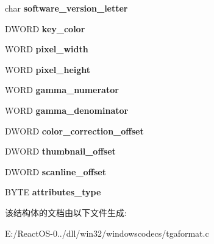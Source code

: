 \begin{DoxyCompactItemize}
\mbox{\label{structtga__extension__area_aed1538062d71b6ccfe2b0451aafec2fa}} 
char {\bfseries software\+\_\+version\+\_\+letter}
\item 
\mbox{\label{structtga__extension__area_a5b31de9df6a94fef8a60e122d2c4b69f}} 
D\+W\+O\+RD {\bfseries key\+\_\+color}
\item 
\mbox{\label{structtga__extension__area_a889c95999ebf8ff6c5fba65e41592b7a}} 
W\+O\+RD {\bfseries pixel\+\_\+width}
\item 
\mbox{\label{structtga__extension__area_aef5a197562a0c959b7172dc496f4e013}} 
W\+O\+RD {\bfseries pixel\+\_\+height}
\item 
\mbox{\label{structtga__extension__area_aa15f2ee20d756fe6d2192c8a793dee25}} 
W\+O\+RD {\bfseries gamma\+\_\+numerator}
\item 
\mbox{\label{structtga__extension__area_afbd48b6f2cb3196da3a8b0379629a447}} 
W\+O\+RD {\bfseries gamma\+\_\+denominator}
\item 
\mbox{\label{structtga__extension__area_a6b6425ddc4f77c329f2143bd56b09654}} 
D\+W\+O\+RD {\bfseries color\+\_\+correction\+\_\+offset}
\item 
\mbox{\label{structtga__extension__area_a2d31f60afd232c32e6f78e5c6a9a1788}} 
D\+W\+O\+RD {\bfseries thumbnail\+\_\+offset}
\item 
\mbox{\label{structtga__extension__area_af3c53b61a9845b6a40aec7be280c5897}} 
D\+W\+O\+RD {\bfseries scanline\+\_\+offset}
\item 
\mbox{\label{structtga__extension__area_ac21fc5f631fe4dd7e4c9632cf11125c5}} 
B\+Y\+TE {\bfseries attributes\+\_\+type}
\end{DoxyCompactItemize}


该结构体的文档由以下文件生成\+:\begin{DoxyCompactItemize}
\item 
E\+:/\+React\+O\+S-\/0../dll/win32/windowscodecs/tgaformat.\+c\end{DoxyCompactItemize}
